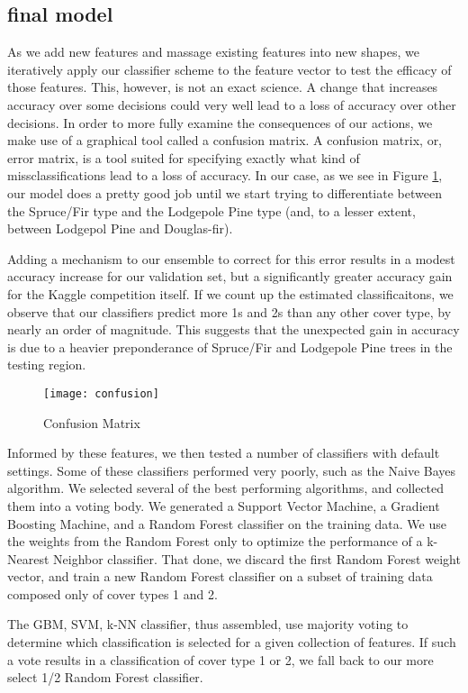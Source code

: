 \subsection{final model}
As we add new features and massage existing features into new shapes, 
we iteratively apply our classifier scheme to the feature vector to 
test the efficacy of those features.  This, however, is not an exact 
science.  A change that increases accuracy over some decisions could 
very well lead to a loss of accuracy over other decisions.  In order to 
more fully examine the consequences of our actions, we make use of a 
graphical tool called a confusion matrix\cite{stehman1997selecting}. A 
confusion matrix, or, error matrix, is a tool suited for specifying 
exactly what kind of missclassifications lead to a loss of accuracy.  
In our case, as we see in Figure \ref{fig:confusion}, our model does a 
pretty good job until we start trying to differentiate between the 
Spruce/Fir type and the Lodgepole Pine type (and, to a lesser extent, 
between Lodgepol Pine and Douglas-fir).  

Adding a mechanism to our ensemble to correct for this error results in 
a modest accuracy increase for our validation set, but a significantly 
greater accuracy gain for the Kaggle competition itself.  If we count 
up the estimated classificaitons, we observe that our classifiers 
predict more 1s and 2s than any other cover type, by nearly an order of 
magnitude.  This suggests that the unexpected gain in accuracy is due 
to a heavier preponderance of Spruce/Fir and Lodgepole Pine trees in 
the testing region.
\begin{figure}
  \texttt{[image: confusion]}
 \caption{Confusion Matrix}
 \label{fig:confusion}
\end{figure}
Informed by these features, we then tested a number of classifiers with 
default settings.  Some of these classifiers performed very poorly, 
such as the Naive Bayes algorithm.  We selected several of the best 
performing algorithms, and collected them into a voting body.  
We generated a Support Vector Machine, a Gradient Boosting Machine, and 
a Random Forest classifier on the training data.  We use the weights 
from the Random Forest only to optimize the performance of a k-Nearest 
Neighbor classifier.  That done, we discard the first Random Forest 
weight vector, and train a new Random Forest classifier on a subset of 
training data composed only of cover types 1 and 2.

The GBM, SVM, k-NN classifier, thus assembled, use majority voting to 
determine which classification is selected for a given collection of 
features.  If such a vote results in a classification of cover type 1 
or 2, we fall back to our more select 1/2 Random Forest classifier.


